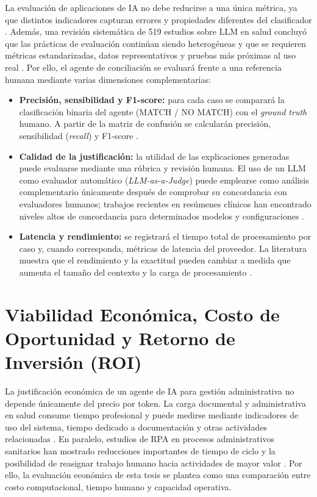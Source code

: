 La evaluación de aplicaciones de IA no debe reducirse a una única métrica, ya que distintos indicadores capturan errores y propiedades diferentes del clasificador \cite{hicks2022metrics}. Además, una revisión sistemática de 519 estudios sobre LLM en salud concluyó que las prácticas de evaluación continúan siendo heterogéneas y que se requieren métricas estandarizadas, datos representativos y pruebas más próximas al uso real \cite{bedi2025evaluation}. Por ello, el agente de conciliación se evaluará frente a una referencia humana mediante varias dimensiones complementarias:

\begin{itemize}
    \item \textbf{Precisión, sensibilidad y F1-score:} para cada caso se comparará la clasificación binaria del agente (MATCH / NO MATCH) con el \textit{ground truth} humano. A partir de la matriz de confusión se calcularán precisión, sensibilidad (\textit{recall}) y F1-score \cite{hicks2022metrics}.
    \item \textbf{Calidad de la justificación:} la utilidad de las explicaciones generadas puede evaluarse mediante una rúbrica y revisión humana. El uso de un LLM como evaluador automático (\textit{LLM-as-a-Judge}) puede emplearse como análisis complementario únicamente después de comprobar su concordancia con evaluadores humanos; trabajos recientes en resúmenes clínicos han encontrado niveles altos de concordancia para determinados modelos y configuraciones \cite{croxford2025judge}.
    \item \textbf{Latencia y rendimiento:} se registrará el tiempo total de procesamiento por caso y, cuando corresponda, métricas de latencia del proveedor. La literatura muestra que el rendimiento y la exactitud pueden cambiar a medida que aumenta el tamaño del contexto y la carga de procesamiento \cite{klang2024cost}.
\end{itemize}

\section{Viabilidad Económica, Costo de Oportunidad y Retorno de Inversión (ROI)}

La justificación económica de un agente de IA para gestión administrativa no depende únicamente del precio por token. La carga documental y administrativa en salud consume tiempo profesional y puede medirse mediante indicadores de uso del sistema, tiempo dedicado a documentación y otras actividades relacionadas \cite{murad2024burden}. En paralelo, estudios de RPA en procesos administrativos sanitarios han mostrado reducciones importantes de tiempo de ciclo y la posibilidad de reasignar trabajo humano hacia actividades de mayor valor \cite{huang2024rpa}. Por ello, la evaluación económica de esta tesis se plantea como una comparación entre costo computacional, tiempo humano y capacidad operativa.

